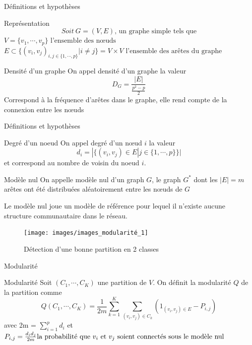 \documentclass[11pt]{beamer}
\begin{document}
	\begin{frame}{Définitions et hypothèses}
		\scriptsize
		\begin{block}{Représentation}
			\[
			Soit~G = (V,E)\text{, un graphe simple tels que}
			\]
			$V = \{v_1, \cdots, v_p\} \text{ l'ensemble des nœuds }$
			$E \subset{\{ (v_i,v_j)_{i,j \in \{1,\cdots,p\}}| i \neq j \}} = V\times V \text{ l'ensemble des arêtes du graphe}$
		\end{block}
		\scriptsize
		\begin{block}{Densité d'un graphe}
			On appel densité d'un graphe la valeur
			\[
			D_G = \frac{|E|}{\frac{p^2-p}{2}}
			\]
			Correspond à la fréquence d'arêtes dans le graphe, elle rend compte de la connexion entre les nœuds
		\end{block}
	\end{frame}
	\begin{frame}{Définitions et hypothèses}
		\small
		\begin{block}{Degré d'un noeud}
			On appel degré d'un nœud $i$ la valeur 
			\[
			d_i = |\{(v_i,v_j) \in E | j \in {\{1,\cdots,p\}} \}| 
			\]
			et correspond au nombre de voisin du noeud $i$.
		\end{block}
		\small
		\begin{block}{Modèle nul}
			On appelle modèle nul d'un graph $G$, le graph $G^*$ dont les $|E| = m$ arêtes ont été distribuées aléatoirement entre les nœuds de $G$\newline

			Le modèle nul joue un modèle de référence pour lequel il n'existe aucune structure communautaire dans le réseau.
		\end{block}
	\end{frame}
	\begin{frame}
		\begin{figure}[H]
			\centering
			\texttt{[image: images/images\_modularité\_1]}
			\caption{Détection d'une bonne partition en 2 classes}
		\end{figure}
	\end{frame}
	\begin{frame}{Modularité}
		\small
		\begin{block}{Modularité}
			Soit $(C_1,\cdots,C_K)$ une partition de $V$.
			On définit la modularité $Q$ de la partition comme 
			\[
			Q(C_1,\cdots,C_K) = \frac{1}{2m}\displaystyle\sum_{k=1}^K \displaystyle\sum_{(v_i,v_j)\in C_k} (1_{(v_i,v_j) \in E} - P_{i,j})
			\]
			avec 2m = $\displaystyle\sum_{i=1}^p d_i$ et $P_{i,j} = \frac{d_i d_j}{2m} \newline
			\text{la probabilité que $v_i$ et $v_j$ soient connectés sous le modèle nul}$
		\end{block}
	\end{frame}
\end{document}
